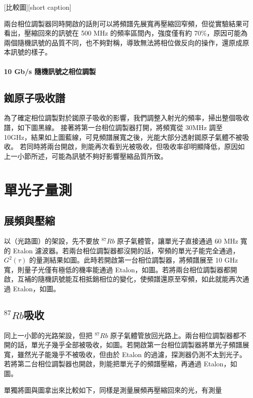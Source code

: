\documentclass[class=NCU_thesis, crop=false]{standalone}
\begin{document}
[比較圖][short caption]

兩台相位調製器同時開啟的話則可以將頻譜先展寬再壓縮回窄頻，但從實驗結果可看出，壓縮回來的訊號在 500 MHz 的頻率區間內，強度僅有約 70\%，原因可能為兩個隨機訊號的品質不同，也不夠對稱，導致無法將相位做反向的操作，還原成原本訊號的樣子。

\paragraph{10 Gb/s 隨機訊號之相位調製}

\subsection{銣原子吸收譜}
為了確定相位調製對於銣原子吸收的影響，我們調整入射光的頻率，掃出整個吸收譜，如下圖黑線。
接著將第一台相位調製器打開，將頻寬從 30MHz 調至 10GHz，結果如上圖藍線，可見頻譜展寬之後，光能大部分透射銣原子氣體不被吸收。
若同時將兩台開啟，則能再次看到光被吸收，但吸收率卻明顯降低，原因如上一小節所述，可能為訊號不夠好影響壓縮品質所致。

\section{單光子量測}
\subsection{展頻與壓縮}
以（光路圖）的架設，先不要放 $^{87}Rb$ 原子氣體管，讓單光子直接通過 60 MHz 寬的 Etalon 濾波器。若兩台相位調製器都沒開的話，窄頻的單光子能完全通過，$G^{2}(\tau)$ 的量測結果如圖。此時若開啟第一台相位調製器，將頻譜展至 10 GHz 寬，則量子光僅有極低的機率能通過 Etalon，如圖。若將兩台相位調製器都開啟，互補的隨機訊號能互相抵銷相位的變化，使頻譜還原至窄頻，如此就能再次通過 Etalon，如圖。

\subsection{$^{87}Rb$吸收}
同上一小節的光路架設，但把 $^{87}Rb$ 原子氣體管放回光路上。兩台相位調製器都不開的話，單光子幾乎全部被吸收，如圖。若開啟第一台相位調製器將單光子頻譜展寬，雖然光子能幾乎不被吸收，但由於 Etalon 的過濾，探測器仍測不太到光子。若將第二台相位調製器也開啟，則能把單光子的頻譜壓縮，再通過 Etalon，如圖。

單獨將圖與圖拿出來比較如下，同樣是測量展頻再壓縮回來的光，有測量

\centering 
\end{document}
